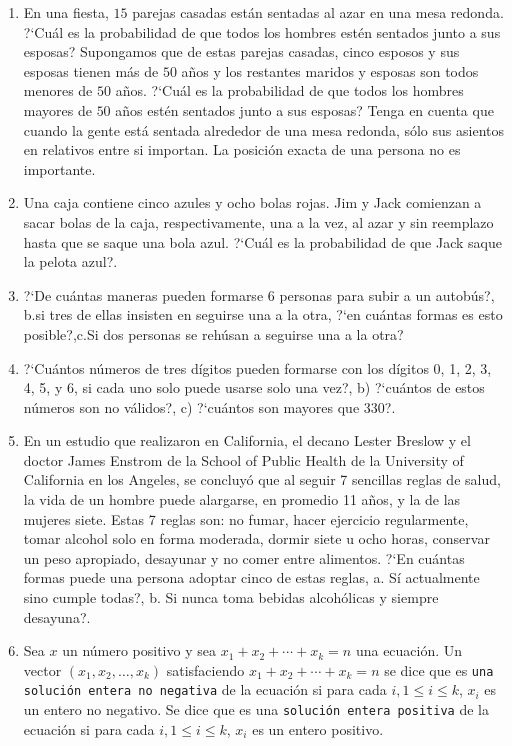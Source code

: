 \documentclass[a4paper,11pt]{report}
\begin{document}
\begin{enumerate}
\item En una fiesta, $15$ parejas casadas est\'an sentadas al azar en una mesa redonda. ?`Cu\'al es la probabilidad de que todos los hombres est\'en sentados junto a sus esposas? Supongamos que de estas parejas casadas, cinco esposos y sus esposas tienen m\'as de $50$ a\~nos y los restantes maridos y esposas son todos menores de $50$ a\~nos. ?`Cu\'al es la probabilidad de que todos los hombres mayores de $50$ a\~nos est\'en sentados junto a sus esposas? Tenga en cuenta que cuando la gente est\'a sentada alrededor de una mesa redonda, s\'olo sus asientos en relativos  entre si importan. La posici\'on exacta de una persona no es importante. 
\item Una caja contiene cinco azules y ocho bolas rojas. Jim y Jack comienzan a sacar bolas de la caja, respectivamente, una a la vez, al azar y sin reemplazo hasta que se saque una bola azul. ?`Cu\'al es la probabilidad de que Jack saque la pelota azul?.             

\item ?`De cu\'antas maneras pueden formarse 6 personas para subir a un autob\'us?, b.si tres de ellas insisten en seguirse una a la otra, ?`en cu\'antas formas es esto posible?,c.Si dos personas se reh\'usan a seguirse una a la otra?

\item ?`Cu\'antos n\'umeros de tres d\'igitos pueden formarse con los d\'igitos 0, 1, 2, 3, 4, 5, y 6, si cada uno solo puede usarse solo una vez?, b) ?`cu\'antos de estos n\'umeros son no v\'alidos?, c) ?`cu\'antos son mayores que 330?.    

\item En un estudio que realizaron en California, el decano Lester Breslow y el doctor James Enstrom de la School of  Public Health de la University of California en los Angeles, se concluy\'o que al seguir 7 sencillas reglas de salud, la vida de un hombre puede alargarse, en promedio 11 a\~nos, y la de las mujeres siete. Estas 7 reglas son: no fumar, hacer ejercicio regularmente, tomar alcohol solo en forma moderada, dormir siete u ocho horas, conservar un peso apropiado, desayunar y no comer entre alimentos. ?`En cu\'antas formas puede una persona adoptar cinco de estas reglas, a. S\'i actualmente sino cumple  todas?, b. Si nunca toma bebidas alcoh\'olicas y siempre desayuna?.   

\item Sea $x$ un n\'umero positivo y sea $x_1 + x_2 + \cdots + x_k = n$ una ecuaci\'on. Un vector $(x_1, x_2, \dots, x_k)$ satisfaciendo  $x_1 + x_2 + \cdots + x_k = n$  se dice que es \texttt{una soluci\'on entera no negativa} de la ecuaci\'on si para cada $i, 1 \leq i \leq k$, $x_i$ es un entero no negativo. Se dice que es una \texttt{soluci\'on entera positiva} de la ecuaci\'on  si para cada $i, 1\leq i \leq k$, $x_i$ es un entero positivo. 



\end{enumerate}
\end{document}
